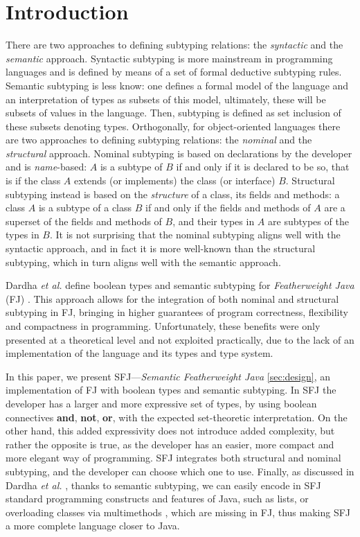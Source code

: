 \documentclass[runningheads]{llncs}
\begin{document}
\section{Introduction}
There are two approaches to defining subtyping relations: the \emph{syntactic} and the \emph{semantic} approach.
Syntactic subtyping is more mainstream in programming languages and is defined by means of a set of formal deductive subtyping rules.
Semantic subtyping is less know:  one defines a formal model of the  language and an interpretation of types as subsets of this model, ultimately, these will be subsets of values in the language. Then, subtyping is defined as set inclusion of these subsets denoting types.
%
Orthogonally, for object-oriented languages there are two approaches to defining subtyping relations: the \emph{nominal} and the \emph{structural} approach.
Nominal subtyping is based on {declarations} by the developer and is \emph{name}-based: $A$ is a subtype of $B$ if and only if it is declared to be so, that is if the class $A$ extends (or implements) the class (or interface) $B$.
Structural subtyping instead is based on the \emph{structure} of a class, its fields and methods: a class $A$ is a subtype of a class $B$ if and only if the fields and methods of $A$ are a superset of the fields and methods of $B$, and their types in $A$ are subtypes of the types in $B$.
It is not surprising that the nominal subtyping aligns well with the syntactic approach, and in fact it is more well-known than the structural subtyping, which in turn aligns well with the semantic approach.

Dardha \emph{et al.} \cite{Dardha2013,Dardha2017} define {boolean types} and semantic subtyping for \emph{Featherweight Java} (FJ) \cite{featherweight}.
This approach allows for the integration of both nominal and structural subtyping in FJ, bringing in higher guarantees of program correctness, flexibility and compactness in programming.
Unfortunately, these benefits were only presented at a theoretical level and not exploited practically, due to the lack of an implementation of the language and its types and type system.

In this paper, we present SFJ---\emph{Semantic Featherweight Java} \autoref{sec:design}, an implementation of FJ with boolean types and semantic subtyping.
In SFJ the developer has a larger and more expressive set of types, by using boolean connectives \textbf{and}, \textbf{not}, \textbf{or}, with the expected set-theoretic interpretation. On the other hand, this added expressivity does not introduce added complexity, but rather the opposite is true, as the developer has an easier, more compact and more elegant way of programming.
SFJ integrates both structural and nominal subtyping, and the developer can choose which one to use.
Finally, as discussed in Dardha \emph{et al.} \cite[\S 8.4]{Dardha2017}, thanks to semantic subtyping, we can easily encode in SFJ standard programming constructs and features of Java, such as lists, or overloading classes via multimethods \cite{BC97}, which are missing in FJ, thus making SFJ a more complete language closer to Java.
\end{document}
